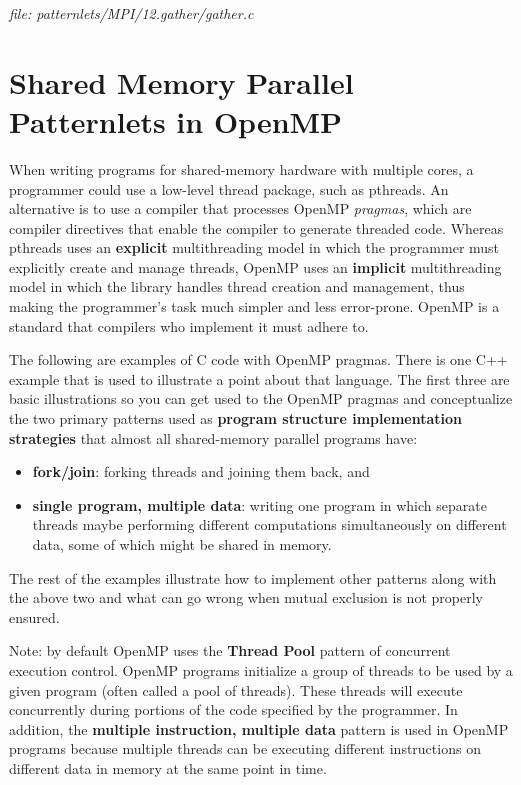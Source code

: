 \documentclass[letterpaper,10pt,openany,oneside]{sphinxmanual}
\begin{document}
\emph{file: patternlets/MPI/12.gather/gather.c}


\chapter{Shared Memory Parallel Patternlets in OpenMP}
\label{SharedMemory/OpenMP_Patternlets:shared-memory-parallel-patternlets-in-openmp}\label{SharedMemory/OpenMP_Patternlets::doc}
When writing programs for shared-memory hardware with multiple cores,
a programmer could use a
low-level thread package, such as pthreads. An alternative is to use
a compiler that processes OpenMP \emph{pragmas}, which are compiler directives that
enable the compiler to generate threaded code.  Whereas pthreads uses an \textbf{explicit}
multithreading model in which the programmer must explicitly create and manage threads,
OpenMP uses an \textbf{implicit} multithreading model in which the library handles
thread creation and management, thus making the programmer's task much simpler and
less error-prone.  OpenMP is a standard that compilers who implement it must adhere to.

The following are examples of C code with OpenMP pragmas.  There is one C++
example that is used to illustrate a point about that language. The first
three are basic illustrations so you can get used to the OpenMP pragmas and
conceptualize the two primary patterns used as
\textbf{program structure implementation strategies} that almost all shared-memory
parallel programs have:
\begin{itemize}
\item {} 
\textbf{fork/join}:  forking threads and joining them back, and

\item {} 
\textbf{single program, multiple data}:  writing one program in which separate threads maybe performing different computations simultaneously on different data, some of which might be shared in memory.

\end{itemize}

The rest of the examples illustrate how to implement other patterns
along with the above two and what can go wrong when mutual exclusion
is not properly ensured.

Note: by default OpenMP uses the \textbf{Thread Pool} pattern of concurrent execution control.
OpenMP programs initialize a group of threads to be used by a given program
(often called a pool of threads).  These threads will execute concurrently
during portions of the code specified by the programmer.  In addition, the \textbf{multiple instruction, multiple data} pattern is used in OpenMP programs because multiple threads can be executing different instructions on different data in memory at the same point in time.
\end{document}

